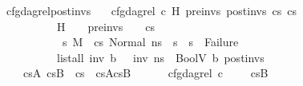 \begin{isabellebody}
\endisatagproof
{\isafoldproof}%
%
\isadelimproof
\isanewline
%
\endisadelimproof
\isanewline
{}\isamarkupfalse%
\ cfg{\isacharunderscore}{\kern0pt}dag{\isacharunderscore}{\kern0pt}rel{\isacharunderscore}{\kern0pt}post{\isacharunderscore}{\kern0pt}invs{\isacharcolon}{\kern0pt}\isanewline
\ \ \ {\isachardoublequoteopen}cfg{\isacharunderscore}{\kern0pt}dag{\isacharunderscore}{\kern0pt}rel\ c\ H\ pre{\isacharunderscore}{\kern0pt}invs\ post{\isacharunderscore}{\kern0pt}invs\ cs{}\ cs{}{\isachardoublequoteclose}\ \isanewline
\ \ \ \ \ \ \ \ \ \ {\isachardoublequoteopen}H\ {\isacharequal}{\kern0pt}\ {\isacharbrackleft}{\kern0pt}{\isacharbrackright}{\kern0pt}{\isachardoublequoteclose}\ \ {\isachardoublequoteopen}pre{\isacharunderscore}{\kern0pt}invs\ {\isacharequal}{\kern0pt}\ {\isacharbrackleft}{\kern0pt}{\isacharbrackright}{\kern0pt}{\isachardoublequoteclose}\ \ {\isachardoublequoteopen}cs{}\ {\isacharequal}{\kern0pt}\ {\isacharbrackleft}{\kern0pt}{\isacharbrackright}{\kern0pt}{\isachardoublequoteclose}\isanewline
\ \ \ \ \ \ \ \ \ \ {\isachardoublequoteopen}{\isasymAnd}\ s{}{\isacharprime}{\kern0pt}{\isachardot}{\kern0pt}\ M{\isacharcomma}{\kern0pt}{\isasymLambda}{\isacharcomma}{\kern0pt}{\isasymGamma}{\isacharcomma}{\kern0pt}{\isasymOmega}\ {\isasymturnstile}\ {\isasymlangle}cs{}{\isacharcomma}{\kern0pt}\ Normal\ ns{\isasymrangle}\ {\isacharbrackleft}{\kern0pt}{\isasymrightarrow}{\isacharbrackright}{\kern0pt}\ s{}{\isacharprime}{\kern0pt}\ {\isasymLongrightarrow}\ s{}{\isacharprime}{\kern0pt}\ {\isasymnoteq}\ Failure{\isachardoublequoteclose}\ \isanewline
\ \ \ \ \ \ \ \ \ \ {\isachardoublequoteopen}list{\isacharunderscore}{\kern0pt}all\ {\isacharparenleft}{\kern0pt}{\isasymlambda}inv{\isachardot}{\kern0pt}\ {\isasymexists}b{\isachardot}{\kern0pt}\ {\isasymLambda}{\isacharcomma}{\kern0pt}{\isasymGamma}{\isacharcomma}{\kern0pt}{\isasymOmega}\ {\isasymturnstile}\ {\isasymlangle}inv{\isacharcomma}{\kern0pt}\ ns{\isasymrangle}\ {\isasymDown}\ BoolV\ b{\isacharparenright}{\kern0pt}\ post{\isacharunderscore}{\kern0pt}invs{\isachardoublequoteclose}\isanewline
\ \ \ {\isachardoublequoteopen}{\isasymexists}\ cs{}A\ cs{}B{\isachardot}{\kern0pt}\ \ cs{}\ {\isacharequal}{\kern0pt}\ cs{}A{\isacharat}{\kern0pt}cs{}B\ {\isasymand}\ \isanewline
\ \ \ \ cfg{\isacharunderscore}{\kern0pt}dag{\isacharunderscore}{\kern0pt}rel\ c\ {\isacharbrackleft}{\kern0pt}{\isacharbrackright}{\kern0pt}\ {\isacharbrackleft}{\kern0pt}{\isacharbrackright}{\kern0pt}\ {\isacharbrackleft}{\kern0pt}{\isacharbrackright}{\kern0pt}\ {\isacharbrackleft}{\kern0pt}{\isacharbrackright}{\kern0pt}\ cs{}B\ {\isasymand}\ \isanewline

\end{isabellebody}
